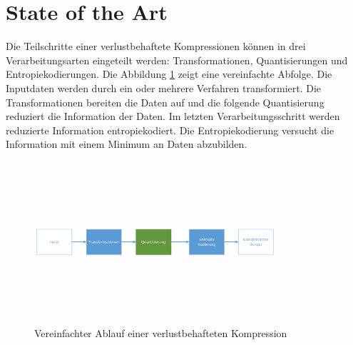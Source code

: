 \section{State of the Art}
Die Teilschritte einer verlustbehaftete Kompressionen können in drei Verarbeitungsarten eingeteilt werden: Transformationen, Quantisierungen und Entropiekodierungen. Die Abbildung \ref{state:aufbau} zeigt eine vereinfachte Abfolge. Die Inputdaten werden durch ein oder mehrere Verfahren transformiert. Die Transformationen bereiten die Daten auf und die folgende Quantisierung reduziert die Information der Daten. Im letzten Verarbeitungsschritt werden reduzierte Information entropiekodiert. Die Entropiekodierung versucht die Information mit einem Minimum an Daten abzubilden.\\
\begin{figure}[!htbp]
	\center
	\includegraphics[width=0.8\textwidth,height=6cm,keepaspectratio]{./pictures/state/aufbau.png}
	\caption{Vereinfachter Ablauf einer verlustbehafteten Kompression}
	\label{state:aufbau}
\end{figure}

